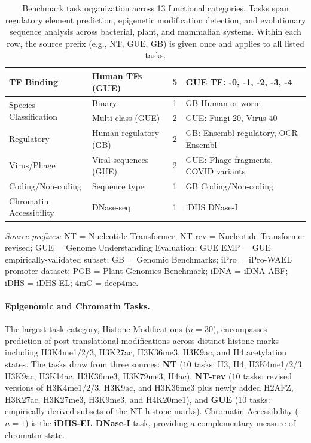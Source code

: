 \documentclass{llmxive}
\begin{document}
\begin{table}[h]
\begin{tabular}{@{}llcp{9.5cm}@{}}
\midrule
TF Binding & Human TFs (GUE) & 5 & GUE TF: -0, -1, -2, -3, -4 \\
\midrule
\multirow{2}{*}{Species Classification} & Binary & 1 & GB Human-or-worm \\
 & Multi-class (GUE) & 2 & GUE: Fungi-20, Virus-40 \\
\midrule
Regulatory & Human regulatory (GB) & 2 & GB: Ensembl regulatory, OCR Ensembl \\
\midrule
Virus/Phage & Viral sequences (GUE) & 2 & GUE: Phage fragments, COVID variants \\
\midrule
Coding/Non-coding & Sequence type & 1 & GB Coding/Non-coding \\
\midrule
Chromatin Accessibility & DNase-seq & 1 & iDHS DNase-I \\
\bottomrule
\end{tabular}
\vspace{1mm}
\begin{flushleft}
\footnotesize\textit{Source prefixes:} NT = Nucleotide Transformer; NT-rev = Nucleotide Transformer revised; GUE = Genome Understanding Evaluation; GUE EMP = GUE empirically-validated subset; GB = Genomic Benchmarks; iPro = iPro-WAEL promoter dataset; PGB = Plant Genomics Benchmark; iDNA = iDNA-ABF; iDHS = iDHS-EL; 4mC = deep4mc.
\end{flushleft}
\caption{Benchmark task organization across 13 functional categories. 
Tasks span regulatory element prediction, epigenetic modification 
detection, and evolutionary sequence analysis across bacterial, 
plant, and mammalian systems. Within each row, the source prefix 
(e.g., NT, GUE, GB) is given once and applies to all listed tasks.}
\label{tab:task_groups}
\end{table}

\paragraph{Epigenomic and Chromatin Tasks.} The largest task
category, Histone Modifications ($n=30$), encompasses prediction
of post-translational modifications across distinct histone
marks including H3K4me1/2/3, H3K27ac, H3K36me3, H3K9ac, and H4
acetylation states. The tasks draw from three sources: \textbf{NT}
($10$ tasks: H3, H4, H3K4me1/2/3, H3K9ac, H3K14ac, H3K36me3,
H3K79me3, H4ac), \textbf{NT-rev} ($10$ tasks: revised versions
of H3K4me1/2/3, H3K9ac, and H3K36me3 plus newly added H2AFZ,
H3K27ac, H3K27me3, H3K9me3, and H4K20me1), and \textbf{GUE}
($10$ tasks: empirically derived subsets of the
NT histone marks). Chromatin Accessibility ($n=1$) is the
\textbf{iDHS-EL DNase-I} task, providing a complementary measure
of chromatin state.
\end{document}
